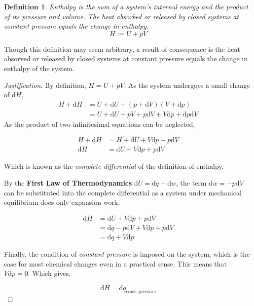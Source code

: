 \documentclass{article}
\numberwithin{theorem}{section}
\numberwithin{corollary}{section}
\numberwithin{postulate}{section}
\numberwithin{lemma}{section}
\newtheorem{definition}{Definition}
\numberwithin{definition}{section}
\newenvironment{justification} {\begin{proof}[Justification]} {\end{proof}}
\begin{document}
\begin{definition}
  Enthalpy is the sum of a system's internal energy and the product of its pressure and
  volume. The heat absorbed or released by closed systems at constant pressure
  equals the change in enthalpy.
  \begin{equation}
   H := U + pV
  \end{equation}
\end{definition}

Though this definition may seem arbitrary, a result of consequence is the heat
absorved or released by closed systems at constant pressure equals the change in
enthalpy of the system.

\begin{justification}
  By definition, $H = U + pV$. As the system undergoes a small change of $\mathrm{d}H$,
  \begin{equation*}
    \begin{split}
      H + \mathrm{d}H & = U + \mathrm{d}U + (p + \mathrm{d}V)(V + \mathrm{d}p) \\
      & = U + \mathrm{d}U + pV + p\mathrm{d}V + V\mathrm{d}p +
      \mathrm{d}p\mathrm{d}V
    \end{split}
  \end{equation*}
  As the product of two infinitesimal equations can be neglected,

  \begin{equation*}
    \begin{split}
      H + \mathrm{d}H & = H + \mathrm{d}U + V\mathrm{d}p + p\mathrm{d}V \\
      \mathrm{d}H & = \mathrm{d}U + V\mathrm{d}p + p\mathrm{d}V
    \end{split}
  \end{equation*}
  
  Which is known as the \textit{complete differential} of the definition of enthalpy.

  By the \textbf{First Law of Thermodynamics} $\mathrm{d}U = \mathrm{d}q + \mathrm{d}w$, the term $\mathrm{d}w = -p\mathrm{d}V$ can be substituted into the complete differential as a system under mechanical equilibrium does only expansion work.
  
  \begin{equation*}
    \begin{split}
      \mathrm{d}H & = \mathrm{d}U + V\mathrm{d}p + p\mathrm{d}V \\
      & = \mathrm{d}q - p\mathrm{d}V + V\mathrm{d}p + p\mathrm{d}V \\
      & = \mathrm{d}q + V\mathrm{d}p
    \end{split}
  \end{equation*}

Finally, the condition of \textit{constant pressure} is imposed on the system, which is the case for most chemical changes even in a practical sense. This means that $V\mathrm{d}p = 0$. Which gives,

\begin{equation}
  \mathrm{d}H = \mathrm{d}q_{\mathrm{const. pressure}}
\end{equation}

\end{justification}
\end{document}
